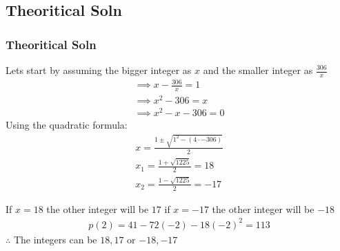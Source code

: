 \documentclass{beamer}
\providecommand{\brak}[1]{\ensuremath{\left(#1\right)}}
\theoremstyle{remark}
\numberwithin{equation}{section}
\begin{document}
\subsection{Theoritical Soln}
\begin{frame}
\frametitle{Theoritical Soln}
Lets start by assuming the bigger integer as $x$ and the smaller integer as $\frac{306}{x}$
\begin{align}
    \implies x-\frac{306}{x}=1\\
    \implies x^2-306=x\\
    \implies x^2-x-306=0
\end{align}
Using the quadratic formula:
\begin{align}
    x=\frac{1\pm\sqrt{1^2-\brak{4\cdot -306}}}{2}\\
    x_1=\frac{1+\sqrt{1225}}{2}=18\\
    x_2=\frac{1-\sqrt{1225}}{2}=-17
\end{align}
\end{frame}
\begin{frame}
If $x=18$ the other integer will be $17$ if $x=-17$ the other integer will be $-18$
\begin{align}
    p\brak{2}=41-72\brak{-2}-18\brak{-2}^2=113
\end{align}
$\therefore$ The integers can be $18,17$ or $-18,-17$\
\end{frame}
\end{document}
